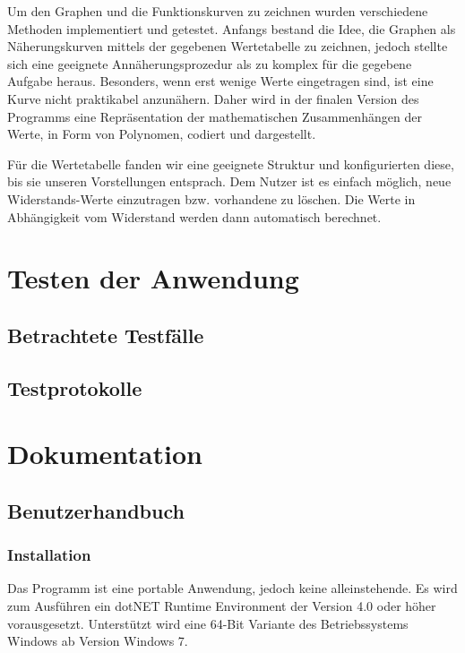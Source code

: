 \documentclass{article}
\begin{document}
    Um den Graphen und die Funktionskurven zu zeichnen wurden verschiedene Methoden implementiert und getestet.
    Anfangs bestand die Idee, die Graphen als Näherungskurven mittels der gegebenen Wertetabelle zu zeichnen, jedoch stellte sich eine geeignete Annäherungsprozedur als zu komplex für die gegebene Aufgabe heraus.
    Besonders, wenn erst wenige Werte eingetragen sind, ist eine Kurve nicht praktikabel anzunähern.
    Daher wird in der finalen Version des Programms eine Repräsentation der mathematischen Zusammenhängen der Werte, in Form von Polynomen, codiert und dargestellt.

    Für die Wertetabelle fanden wir eine geeignete Struktur und konfigurierten diese, bis sie unseren Vorstellungen entsprach.
    Dem Nutzer ist es einfach möglich, neue Widerstands-Werte einzutragen bzw. vorhandene zu löschen.
    Die Werte in Abhängigkeit vom Widerstand werden dann automatisch berechnet.

\newpage
\section{Testen der Anwendung}

\subsection{Betrachtete Testfälle}


\subsection{Testprotokolle}


\newpage
\section{Dokumentation}

\subsection{Benutzerhandbuch}
    \subsubsection{Installation}

    Das Programm ist eine portable Anwendung, jedoch keine alleinstehende.
    Es wird zum Ausführen ein \glqq dotNET Runtime Environment\grqq{} der Version 4.0 oder höher vorausgesetzt.
    Unterstützt wird eine 64-Bit Variante des Betriebssystems Windows ab Version \glqq Windows 7\grqq{}.
\end{document}
